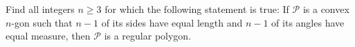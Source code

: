 Find all integers $n\geq3$ for which the following statement is true: If $\mathcal{P}$ is a convex $n$-gon such that $n-1$ of its sides have equal length and $n-1$ of its angles have equal measure, then $\mathcal{P}$ is a regular polygon.

